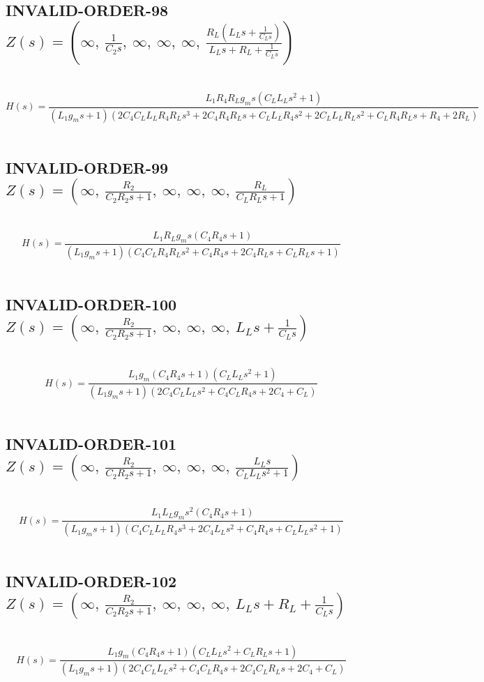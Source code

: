 \documentclass{article}
\begin{document}
\subsection{INVALID-ORDER-98 $Z(s) = \left( \infty, \  \frac{1}{C_{2} s}, \  \infty, \  \infty, \  \infty, \  \frac{R_{L} \left(L_{L} s + \frac{1}{C_{L} s}\right)}{L_{L} s + R_{L} + \frac{1}{C_{L} s}}\right)$ } \ 
\textbf{\[H(s) = \frac{L_{1} R_{4} R_{L} g_{m} s \left(C_{L} L_{L} s^{2} + 1\right)}{\left(L_{1} g_{m} s + 1\right) \left(2 C_{4} C_{L} L_{L} R_{4} R_{L} s^{3} + 2 C_{4} R_{4} R_{L} s + C_{L} L_{L} R_{4} s^{2} + 2 C_{L} L_{L} R_{L} s^{2} + C_{L} R_{4} R_{L} s + R_{4} + 2 R_{L}\right)}\] } \ 
\subsection{INVALID-ORDER-99 $Z(s) = \left( \infty, \  \frac{R_{2}}{C_{2} R_{2} s + 1}, \  \infty, \  \infty, \  \infty, \  \frac{R_{L}}{C_{L} R_{L} s + 1}\right)$ } \ 
\textbf{\[H(s) = \frac{L_{1} R_{L} g_{m} s \left(C_{4} R_{4} s + 1\right)}{\left(L_{1} g_{m} s + 1\right) \left(C_{4} C_{L} R_{4} R_{L} s^{2} + C_{4} R_{4} s + 2 C_{4} R_{L} s + C_{L} R_{L} s + 1\right)}\] } \ 
\subsection{INVALID-ORDER-100 $Z(s) = \left( \infty, \  \frac{R_{2}}{C_{2} R_{2} s + 1}, \  \infty, \  \infty, \  \infty, \  L_{L} s + \frac{1}{C_{L} s}\right)$ } \ 
\textbf{\[H(s) = \frac{L_{1} g_{m} \left(C_{4} R_{4} s + 1\right) \left(C_{L} L_{L} s^{2} + 1\right)}{\left(L_{1} g_{m} s + 1\right) \left(2 C_{4} C_{L} L_{L} s^{2} + C_{4} C_{L} R_{4} s + 2 C_{4} + C_{L}\right)}\] } \ 
\subsection{INVALID-ORDER-101 $Z(s) = \left( \infty, \  \frac{R_{2}}{C_{2} R_{2} s + 1}, \  \infty, \  \infty, \  \infty, \  \frac{L_{L} s}{C_{L} L_{L} s^{2} + 1}\right)$ } \ 
\textbf{\[H(s) = \frac{L_{1} L_{L} g_{m} s^{2} \left(C_{4} R_{4} s + 1\right)}{\left(L_{1} g_{m} s + 1\right) \left(C_{4} C_{L} L_{L} R_{4} s^{3} + 2 C_{4} L_{L} s^{2} + C_{4} R_{4} s + C_{L} L_{L} s^{2} + 1\right)}\] } \ 
\subsection{INVALID-ORDER-102 $Z(s) = \left( \infty, \  \frac{R_{2}}{C_{2} R_{2} s + 1}, \  \infty, \  \infty, \  \infty, \  L_{L} s + R_{L} + \frac{1}{C_{L} s}\right)$ } \ 
\textbf{\[H(s) = \frac{L_{1} g_{m} \left(C_{4} R_{4} s + 1\right) \left(C_{L} L_{L} s^{2} + C_{L} R_{L} s + 1\right)}{\left(L_{1} g_{m} s + 1\right) \left(2 C_{4} C_{L} L_{L} s^{2} + C_{4} C_{L} R_{4} s + 2 C_{4} C_{L} R_{L} s + 2 C_{4} + C_{L}\right)}\] } \ 
\end{document}
